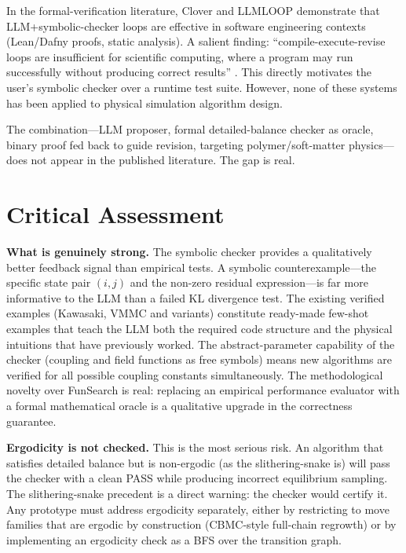 \documentclass[10.5pt]{article}
\begin{document}
In the formal-verification literature, Clover \cite{clover2024} and LLMLOOP
\cite{llmloop2025} demonstrate that LLM+symbolic-checker loops are effective in
software engineering contexts (Lean/Dafny proofs, static analysis).  A salient
finding: ``compile-execute-revise loops are insufficient for scientific computing,
where a program may run successfully without producing correct results''
\cite{llmloop2025}.  This directly motivates the user's symbolic checker over a
runtime test suite.  However, none of these systems has been applied to physical
simulation algorithm design.

The combination---LLM proposer, formal detailed-balance checker as oracle, binary
proof fed back to guide revision, targeting polymer/soft-matter physics---does not
appear in the published literature.  The gap is real.

\section{Critical Assessment}

\textbf{What is genuinely strong.}  The symbolic checker provides a qualitatively
better feedback signal than empirical tests.  A symbolic counterexample---the
specific state pair $(i,j)$ and the non-zero residual expression---is far more
informative to the LLM than a failed KL divergence test.  The existing verified
examples (Kawasaki, VMMC and variants) constitute ready-made few-shot examples that
teach the LLM both the required code structure and the physical intuitions that have
previously worked.  The abstract-parameter capability of the checker (coupling and
field functions as free symbols) means new algorithms are verified for all possible
coupling constants simultaneously.  The methodological novelty over FunSearch is
real: replacing an empirical performance evaluator with a formal mathematical oracle
is a qualitative upgrade in the correctness guarantee.

\textbf{Ergodicity is not checked.}  This is the most serious risk.  An algorithm
that satisfies detailed balance but is non-ergodic (as the slithering-snake is) will
pass the checker with a clean PASS while producing incorrect equilibrium sampling.
The slithering-snake precedent is a direct warning: the checker would certify it.
Any prototype must address ergodicity separately, either by restricting to move
families that are ergodic by construction (CBMC-style full-chain regrowth) or by
implementing an ergodicity check as a BFS over the transition graph.
\end{document}
